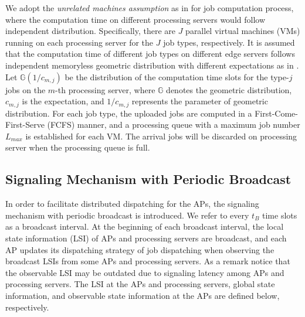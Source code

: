 We adopt the \emph{unrelated machines assumption} as in \cite{tan-online} for job computation process, where the computation time on different processing servers would follow independent distribution.
Specifically, there are $J$ parallel virtual machines (VMs) running on each processing server for the $J$ job types, respectively.
It is assumed that the computation time of different job types on different edge servers follows independent memoryless geometric distribution 
with different expectations as in \cite{TOWC18-HuangKb}.
Let $\mathbb{G}(1/c_{m,j})$ be the distribution of the computation time slots for the type-$j$ jobs on the $m$-th processing server, where $\mathbb{G}$ denotes the geometric distribution, $c_{m,j}$ is the expectation, and {$1/c_{m,j}$ represents the parameter of geometric distribution}.
For each job type, the uploaded jobs are computed in a First-Come-First-Serve (FCFS) manner, and a processing queue with a maximum job number $L_{max}$ is established for each VM.
The arrival jobs will be discarded on processing server when the processing queue is full.
\subsection{{Signaling Mechanism with Periodic Broadcast}}
\label{subsec:broadcast}
In order to facilitate distributed dispatching for the APs, the signaling mechanism with periodic broadcast is introduced.
We refer to every $t_B$ time slots as a broadcast interval.
At the beginning of each broadcast interval, the local state information (LSI) of APs and processing servers are broadcast, and each AP updates its dispatching strategy of job dispatching when observing the broadcast LSIs from some APs and processing servers.
As a remark notice that the observable LSI may be outdated due to signaling latency among APs and processing servers.
The LSI at the APs and processing servers, global state information, and observable state information at the APs are defined below, respectively.

